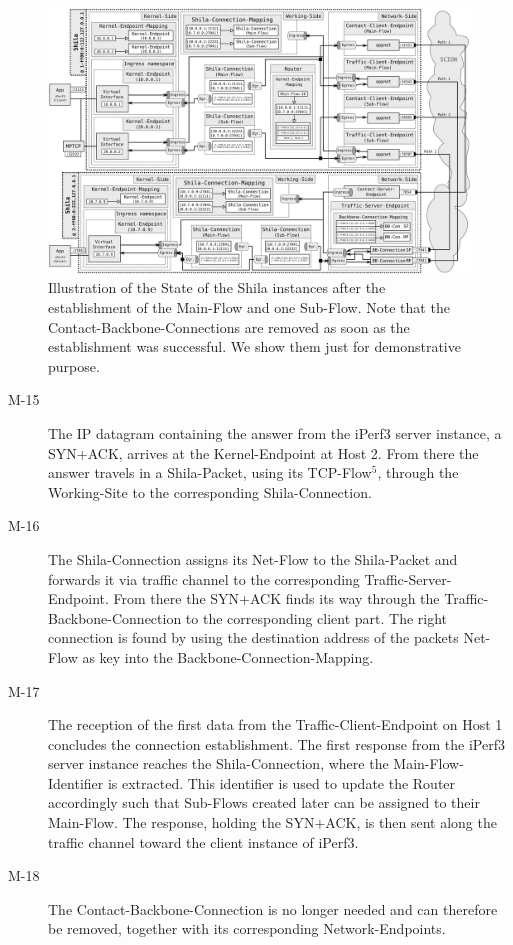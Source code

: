 	\begin{landscape}
		\begin{figure}
			\begin{center}
				\def\svgwidth{1\textwidth}
				\includegraphics[scale=0.2]{../illustrations/implementation/ConnectionEstablishment.pdf}   
				\caption[]{Illustration of the State of the Shila instances after the establishment of the Main-Flow and one Sub-Flow. Note that the Contact-Backbone-Connections are removed as soon as the establishment was successful. We show them just for demonstrative purpose.}
				\label{fig:ConnectionEstablishment}
			\end{center}
		\end{figure}
	\end{landscape}
\begin{description}		
	\item[M-15] The IP datagram containing the answer from the iPerf3 server instance, a SYN+ACK, arrives at the Kernel-Endpoint at Host 2. From there the answer travels in a Shila-Packet, using its TCP-Flow$^{5}$, through the Working-Site to the corresponding Shila-Connection.
	\item[M-16] The Shila-Connection assigns its Net-Flow to the Shila-Packet and forwards it via traffic channel to the corresponding Traffic-Server-Endpoint. From there the SYN+ACK finds its way through the Traffic-Backbone-Connection to the corresponding client part. The right connection is found by using the destination address of the packets Net-Flow as key into the Backbone-Connection-Mapping.
	\item[M-17] The reception of the first data from the Traffic-Client-Endpoint on Host 1 concludes the connection establishment. The first response from the iPerf3 server instance reaches the Shila-Connection, where the Main-Flow-Identifier is extracted. This identifier is used to update the Router accordingly such that Sub-Flows created later can be assigned to their Main-Flow. The response, holding the SYN+ACK, is then sent along the traffic channel toward the client instance of iPerf3.
	\item[M-18] The Contact-Backbone-Connection is no longer needed and can therefore be removed, together with its corresponding Network-Endpoints.
\end{description}

